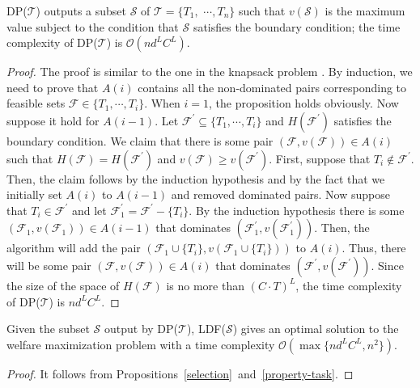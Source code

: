 \documentclass[10pt,journal,compsoc]{IEEEtran}
\begin{document}
\begin{proposition}\label{selection}
DP($\mathcal{T}$) outputs a subset $\mathcal{S}$ of $\mathcal{T}=\{T_{1},$ $\cdots, T_{n}\}$ such that $v(\mathcal{S})$ is the maximum value subject to the condition that $\mathcal{S}$ satisfies the boundary condition; the time complexity of DP($\mathcal{T}$) is $\mathcal{O}(nd^{L}C^{L})$.
\end{proposition}
\begin{proof}
The proof is similar to the one in the knapsack problem \cite{Williamson}. By induction, we need to prove that $A(i)$ contains all the non-dominated pairs corresponding to feasible sets $\mathcal{F}\in\{T_{1}, \cdots, T_{i}\}$. When $i=1$, the proposition holds obviously. Now suppose it hold for $A(i-1)$. Let $\mathcal{F}^{\prime}\subseteq \{T_{1}, \cdots, T_{i}\}$ and $H(\mathcal{F}^{\prime})$ satisfies the boundary condition. We claim that there is some pair $(\mathcal{F}, v(\mathcal{F}))\in A(i)$ such that $H(\mathcal{F})=H(\mathcal{F}^{\prime})$ and $v(\mathcal{F})\geq v(\mathcal{F}^{\prime})$. First, suppose that $T_{i}\notin\mathcal{F}^{\prime}$. Then, the claim follows by the induction hypothesis and by the fact that we initially set $A(i)$ to $A(i-1)$ and removed dominated pairs. Now suppose that $T_{i}\in\mathcal{F}^{\prime}$ and let $\mathcal{F}_{1}^{\prime}=\mathcal{F}^{\prime}-\{T_{i}\}$.  By the induction hypothesis there is some $(\mathcal{F}_{1}, v(\mathcal{F}_{1}))\in A(i-1)$ that dominates $(\mathcal{F}_{1}^{\prime}, v(\mathcal{F}_{1}^{\prime}))$. Then, the algorithm will add the pair $(\mathcal{F}_{1}\cup\{T_{i}\}, v(\mathcal{F}_{1}\cup\{T_{i}\}))$ to $A(i)$. Thus, there will be some pair $(\mathcal{F}, v(\mathcal{F}))\in A(i)$ that dominates $(\mathcal{F}^{\prime}, v(\mathcal{F}^{\prime}))$. Since the size of the space of $H(\mathcal{F})$ is no more than $(C\cdot T)^{L}$, the time complexity of DP($\mathcal{T}$) is $nd^{L}C^{L}$. \end{proof}



\begin{proposition}\label{proposition-DP}
Given the subset $\mathcal{S}$ output by DP($\mathcal{T}$), LDF($\mathcal{S}$) gives an optimal solution to the welfare maximization problem with a time complexity $\mathcal{O}(\max\{nd^{L}C^{L}, n^{2}\})$.
\end{proposition}
\begin{proof}
It follows from Propositions~\ref{selection}~and~\ref{property-task}.
\end{proof}
\end{document}
